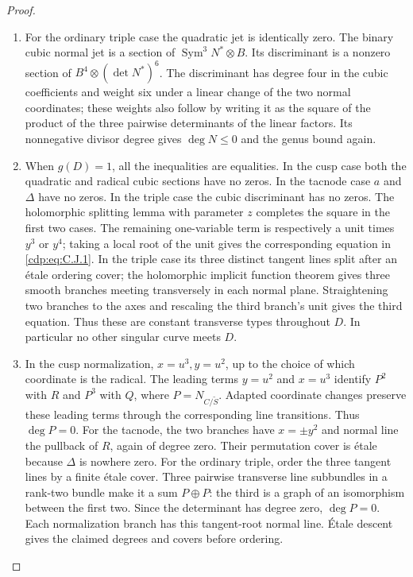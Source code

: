 \begin{proof}
\begin{enumerate}[label={$\langle1\rangle$\arabic*.},leftmargin=*]
\item For the ordinary triple case the quadratic jet is identically zero. The binary cubic normal jet is a section of $\operatorname{Sym}^3N^*\otimes B$. Its discriminant is a nonzero section of
$B^4\otimes(\det N^*)^6$. The discriminant has degree four in the cubic coefficients and weight six under a linear change of the two normal coordinates; these weights also follow by writing it as the square of the product of the three pairwise determinants of the linear factors. Its nonnegative divisor degree gives $\deg N\le0$ and the genus bound again.

\item When $g(D)=1$, all the inequalities are equalities. In the cusp case both the quadratic and radical cubic sections have no zeros. In the tacnode case $a$ and $\Delta$ have no zeros. In the triple case the cubic discriminant has no zeros. The holomorphic splitting lemma with parameter $z$ completes the square in the first two cases. The remaining one-variable term is respectively a unit times $y^3$ or $y^4$; taking a local root of the unit gives the corresponding equation in \eqref{cdp:eq:C.J.1}. In the triple case its three distinct tangent lines split after an \'etale ordering cover; the holomorphic implicit function theorem gives three smooth branches meeting transversely in each normal plane. Straightening two branches to the axes and rescaling the third branch's unit gives the third equation. Thus these are constant transverse types throughout $D$. In particular no other singular curve meets $D$.

\item In the cusp normalization, $x=u^3,y=u^2$, up to the choice of which coordinate is the radical. The leading terms $y=u^2$ and $x=u^3$ identify
$P^2$ with $R$ and $P^3$ with $Q$, where
$P=N_{C/\widetilde S}$. Adapted coordinate changes preserve these
leading terms through the corresponding line transitions. Thus
$\deg P=0$. For the tacnode, the two branches have $x=\pm y^2$ and normal line the pullback of $R$, again of degree zero. Their permutation cover is \'etale because $\Delta$ is nowhere zero. For the ordinary triple, order the three tangent lines by a finite \'etale cover. Three pairwise transverse line subbundles in a rank-two bundle make it a sum $P\oplus P$: the third is a graph of an isomorphism between the first two. Since the determinant has degree zero, $\deg P=0$. Each normalization branch has this tangent-root normal line. \'{E}tale descent gives the claimed degrees and covers before ordering.


\end{enumerate}
\end{proof}

